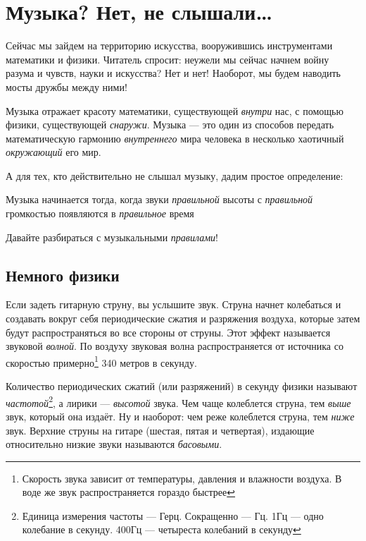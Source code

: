 \chapter{Музыка? Нет, не слышали\ldots}
\label{ch:music}

Сейчас мы зайдем на территорию искусства, вооружившись инструментами математики и физики. Читатель спросит: неужели мы сейчас начнем войну разума и чувств, науки и искусства? Нет и нет! Наоборот, мы будем наводить мосты дружбы между ними! 

Музыка отражает красоту математики, существующей \emph{внутри} нас, с помощью физики, существующей \emph{снаружи}. Музыка --- это один из способов передать математическую гармонию \emph{внутреннего} мира человека в несколько хаотичный \emph{окружающий} его мир.

А для тех, кто действительно не слышал музыку, дадим простое определение:

\begin{Definition}[Музыка]
    Музыка начинается тогда, когда звуки \emph{правильной} высоты с \emph{правильной} громкостью появляются в \emph{правильное} время
\end{Definition}

Давайте разбираться с музыкальными \emph{правилами}!


\section{Немного физики}
\label{ch:music:physics}

Если задеть гитарную струну, вы услышите звук. Струна начнет колебаться и создавать вокруг себя периодические сжатия и разряжения воздуха, которые затем будут распространяться во все стороны от струны. Этот эффект называется звуковой \emph{волной}. По воздуху звуковая волна распространяется от источника со скоростью примерно\footnote{Скорость звука зависит от температуры, давления и влажности воздуха. В воде же звук распространяется гораздо быстрее} 340 метров в секунду.

Количество периодических сжатий (или разряжений) в секунду физики называют \emph{частотой}\footnote{Единица измерения частоты --- Герц. Сокращенно --- Гц. 1Гц --- одно колебание в секунду. 400Гц --- четыреста колебаний в секунду}, а лирики --- \emph{высотой} звука. Чем чаще колеблется струна, тем \emph{выше} звук, который она издаёт. Ну и наоборот: чем реже колеблется струна, тем \emph{ниже} звук. Верхние струны на гитаре (шестая, пятая и четвертая), издающие относительно низкие звуки называются \emph{басовыми}.

